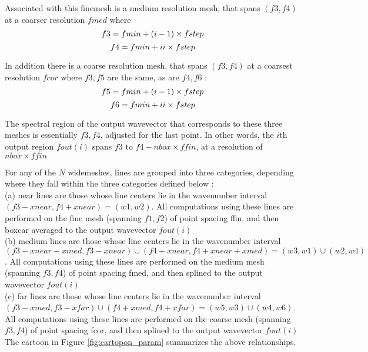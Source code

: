 \documentclass[11pt]{article}
\begin{document}
Associated with this finemesh is a medium resolution mesh, that spans 
$(f3,f4)$ at a coarser resolution $fmed$ where
\begin{displaymath}
f3 = fmin + (i-1) \times fstep\\
\end{displaymath}
\begin{equation}
f4 = fmin + ii \times fstep\\
\end{equation}

In addition there is a coarse resolution mesh, that spans 
$(f3,f4)$ at a coarsest resolution $fcor$ where $f3,f5$ are the same, as are
$f4,f6$ : 
\begin{displaymath}
f5 = fmin + (i-1) \times fstep\\
\end{displaymath}
\begin{equation}
f6 = fmin + ii \times fstep\\
\end{equation}

The spectral region of the output wavevector that corresponds to these 
three meshes is essentially $f3,f4$, adjusted for the last point. In other 
words, the
$i$th output region $fout(i)$ spans $f3$ to $f4-nbox \times ffin$, at a 
resolution of $nbox \times ffin$

For any of the $N$ widemeshes, lines are grouped into three categories, 
depending where they fall within the three categories defined below : \\
(a) near lines are those whose line centers lie in the wavenumber interval
$(f3-xnear,f4+xnear)=(w1,w2)$. All computations using these lines are 
performed on the fine mesh (spanning $f1,f2$) of point spacing ffin, 
and then boxcar averaged to the output wavevector $fout(i)$ \\
(b) medium lines are those whose line centers lie in the wavenumber interval
$(f3-xnear-xmed,f3-xnear) \cup (f4+xnear,f4+xnear+xmed)=(w3,w1) \cup (w2,w4)$. 
All computations using these lines are performed on the medium mesh 
(spanning $f3,f4$) of 
point spacing fmed, and then splined to the output wavevector $fout(i)$\\
(c) far lines are those whose line centers lie in the wavenumber interval
$(f3-xmed,f3-xfar)\cup(f4+xmed,f4+xfar)=(w5,w3)\cup (w4,w6)$. All 
computations using these lines are performed on the coarse mesh 
(spanning $f3,f4$) of 
point spacing fcor, and then splined to the output wavevector $fout(i)$\\
The cartoon in Figure \ref{fig:cartopon_param} summarizes the above 
relationships.
\end{document}
